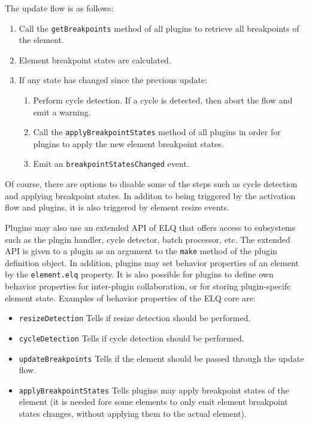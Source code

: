 \documentclass{acm_proc_article-sp}
\newcommand{\code}[1]{\texttt{#1}}
\newcommand{\elq}{ELQ}
\begin{document}
  The update flow is as follows:
  \begin{enumerate}
    \item Call the \code{getBreakpoints} method of all plugins to retrieve all breakpoints of the element.
    \item Element breakpoint states are calculated.
    \item If any state has changed since the previous update:
    \begin{enumerate}
      \item Perform cycle detection. If a cycle is detected, then abort the flow and emit a warning.
      \item Call the \code{applyBreakpointStates} method of all plugins in order for plugins to apply the new element breakpoint states.
      \item Emit an \code{breakpointStatesChanged} event.
    \end{enumerate}
  \end{enumerate}

  Of course, there are options to disable some of the steps such as cycle detection and applying breakpoint states.
  In additon to being triggered by the activation flow and plugins, it is also triggered by element resize events.

  Plugins may also use an extended API of \elq{} that offers access to subsystems such as the plugin handler, cycle detector, batch processor, etc.
  The extended API is given to a plugin as an argument to the \code{make} method of the plugin definition object.
  In addition, plugins may set behavior properties of an element by the \code{element.elq} property.
  It is also possible for plugins to define own behavior properties for inter-plugin collaboration, or for storing plugin-specifc element state.
  Examples of behavior properties of the \elq{} core are:
  \begin{itemize}
    \item \code{resizeDetection} Tells if resize detection should be performed.
    \item \code{cycleDetection} Tells if cycle detection should be performed.
    \item \code{updateBreakpoints} Tells if the element should be passed through the update flow.
    \item \code{applyBreakpointStates} Tells plugins may apply breakpoint states of the element (it is needed fore some elements to only emit element breakpoint states changes, without applying them to the actual element).
  \end{itemize}
\end{document}
